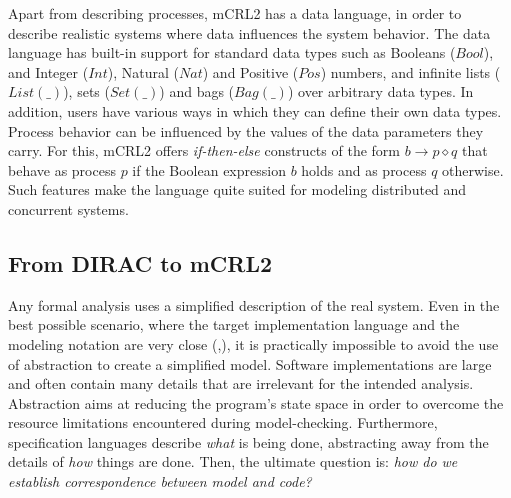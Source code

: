 \documentclass[10pt,conference]{IEEEtran}
\begin{document}
Apart from describing processes, mCRL2 has a data language, in order to describe
realistic systems where data influences the system behavior.
 The data language has built-in support for standard data types
such as Booleans (\begin{math}Bool\end{math}), and Integer (\begin{math}Int\end{math}),
Natural (\begin{math}Nat\end{math}) and Positive (\begin{math}Pos\end{math}) numbers,
and infinite lists (\begin{math}List(\_)\end{math}), sets (\begin{math}Set(\_)\end{math})
and bags (\begin{math}Bag(\_)\end{math}) over arbitrary data types. In addition,
users have various ways in which they can define their own data types.
Process behavior can be influenced by the values of the data parameters they carry. For this, mCRL2 offers
\emph{if-then-else} constructs of the form \begin{math}b\rightarrow p\diamond q\end{math} that
behave as process \begin{math}p\end{math} if the Boolean expression \begin{math}b\end{math}
holds and as process \begin{math}q\end{math} otherwise. 
Such features make the language quite suited
for modeling distributed and concurrent systems.

\subsection{From DIRAC to mCRL2}

Any formal analysis uses a simplified description of the real system. Even in the 
best possible scenario, where the target implementation language and the modeling 
notation are very close (\cite{Java_PathFinder},\cite{Musuvathi04modelchecking}), 
it is practically impossible to avoid the use of abstraction to create a simplified model. 
Software implementations are large and often contain many details that are irrelevant 
for the intended analysis. Abstraction aims at reducing
the program's state space in order to overcome the resource limitations \cite{Pelánek08fightingstate} encountered during model-checking.
Furthermore, specification languages describe \textit{what} is being done, 
abstracting away from the details of \textit{how} things are done. 
Then, the ultimate question is: \textit{how do we establish correspondence between model and code?}
\end{document}
